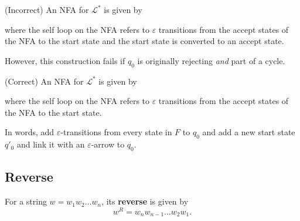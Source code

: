 \documentclass{notes}
\begin{document}
\begin{prf}
  {\color{red} (Incorrect)} An NFA for $\mathcal L^*$ is given by 

  \begin{center}
  \end{center}
  where the self loop on the NFA refers to $\varepsilon$ transitions from the accept states of the NFA to the start state and the start state is converted to an accept state.
  
  However, this construction fails if $q_0$ is originally rejecting \textit{and} part of a cycle.
\end{prf}

\begin{prf}
  {\color{green} (Correct)} An NFA for $\mathcal L^*$ is given by 

  \begin{center}
  \end{center}
  where the self loop on the NFA refers to $\varepsilon$ transitions from the accept states of the NFA to the start state.
  
  In words, add $\varepsilon$-transitions from every state in $F$ to $q_0$ and add a new start state $q'_0$ and link it with an $\varepsilon$-arrow to $q_0$.
\end{prf}

\newpage

\subsection{Reverse}

\begin{defn}
  For a string $w = w_1 w_2 \dots w_n$, its {\boldmath \bfseries reverse} is given by 
  \[
    w^R = w_n w_{n - 1} \dots w_2 w_1.
  \]
\end{defn}
\end{document}
